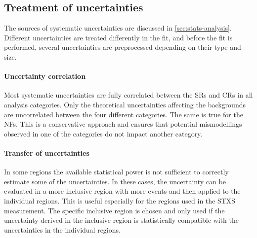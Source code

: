 
\subsection{Treatment of uncertainties}
The sources of systematic uncertainties are discussed in \cref{sec:stats-analysis}. 
Different uncertainties are treated differently in the fit, and before the fit is performed, several uncertainties are preprocessed depending on their type and size. 

\paragraph{Uncertainty correlation}
Most systematic uncertainties are fully correlated between the SRs and CRs in all analysis categories. Only the theoretical uncertainties affecting the backgrounds are uncorrelated between the four different categories. The same is true for the NFs. This is a conservative approach and ensures that potential mismodellings observed in one of the categories do not impact another category. 

\paragraph{Transfer of uncertainties}
In some regions the available statistical power is not sufficient to correctly estimate some of the uncertainties. 
In these cases, the uncertainty can be evaluated in a more inclusive region with more events and then applied to the individual regions. This is useful especially for the regions used in the STXS measurement. The specific inclusive region is chosen and only used if the uncertainty derived in the inclusive region is statistically compatible with the uncertainties in the individual regions. 

